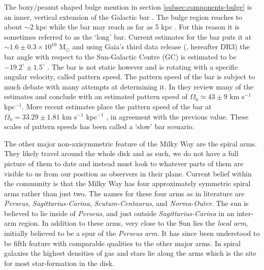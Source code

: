 The boxy/peanut shaped bulge mention in section \ref{subsec:components-bulge} is an inner, vertical extension of the Galactic bar \citep{bland-hawthorn:16}. The bulge region reaches to about ${\sim}2$ kpc \citep{wegg:13} while the bar may reach as far as 5 kpc \citep{wegg:15}. For this reason it is sometimes referred to as the `long' bar. Current estimates for the bar puts it at ${\sim}1.6\pm 0.3 \times 10^10$ M$_\odot$ \citep{kipper:20} and using Gaia's third data release (\citealt{dr3}, hereafter DR3) the bar angle with respect to the Sun-Galactic Centre (GC) is estimated to be $-19.2^\circ \pm 1.5^\circ$ \citep{dr3:asymmetries}. The bar is not static however and is rotating with a specific angular velocity, called pattern speed. The pattern speed of the bar is subject to much debate with many attempts at determining it. In \cite{bland-hawthorn:16} they review many of the estimates and conclude with an estimated pattern speed of $\Omega_\mathrm{b} \simeq 43 \pm 9$ km s$^{-1}$ kpc$^{-1}$. More recent estimates place the pattern speed of the bar at $\Omega_\mathrm{b} = 33.29 \pm 1.81$ km s$^{-1}$ kpc$^{-1}$ \citep{clarke:22}, in agreement with the previous value. These scales of pattern speeds has been called a `slow' bar scenario.

The other major non-axisymmetric feature of the Milky Way are the spiral arms. They likely travel around the whole disk and as such, we do not have a full picture of them to date and instead must look to whatever parts of them are visible to us from our position as observers in their plane. Current belief within the community is that the Milky Way has four approximately symmetric spiral arms \citep{vallee:17} rather than just two. The names for these four arms as in literature are \textit{Perseus}, \textit{Sagittarius-Carina}, \textit{Scutum-Centaurus}, and \textit{Norma-Outer}. The sun is believed to lie inside of \textit{Perseus}, and just outside \textit{Sagittarius-Carina} in an inter-arm region. In addition to these arms, very close to the Sun lies the \textit{local arm}, initially believed to be a spur of the \textit{Perseus arm}. It has since been understood to be fifth feature with comparable qualities to the other major arms. In spiral galaxies the highest densities of gas and stars lie along the arms which is the site for most star-formation in the disk. 

